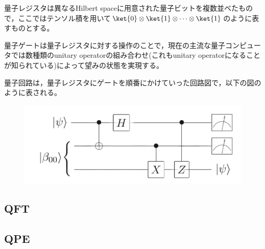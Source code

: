 \documentclass[b5paper,papersize,fleqn]{jsarticle}
\begin{document}
量子レジスタは異なるHilbert spaceに用意された量子ビットを複数並べたもので，ここではテンソル積を用いて$\ket{0}\otimes \ket{1}\otimes \cdots \otimes \ket{1}$のように表すものとする。

量子ゲートは量子レジスタに対する操作のことで，現在の主流な量子コンピュータでは数種類のunitary operatorの組み合わせ(これもunitary operatorになることが知られている)によって望みの状態を実現する。

量子回路は，量子レジスタにゲートを順番にかけていった回路図で，以下の図のように表される。
\begin{center}
  \begin{figure}[h]
      \includegraphics[width = 0.5texwidth]{circuit.png}
  \end{figure}
\end{center}
\subsection{QFT}
\subsection{QPE}
\end{document}
